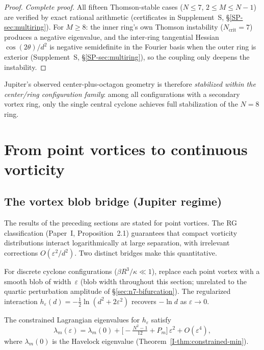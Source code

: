 \begin{proof}
\emph{Complete proof.}
All fifteen Thomson-stable cases ($N \le 7$, $2 \le M \le N{-}1$)
are verified by exact rational arithmetic (certificates in
Supplement~S, \S\ref*{SP-sec:multiring}).
For $M \ge 8$: the inner ring's own Thomson instability
($N_{\mathrm{crit}} = 7$) produces a negative eigenvalue,
and the inter-ring tangential Hessian $\cos(2\theta)/d^2$
is negative semidefinite in the Fourier basis when the
outer ring is exterior (Supplement~S,
\S\ref*{SP-sec:multiring}), so the coupling only
deepens the instability.
\end{proof}

\noindent
Jupiter's observed center-plus-octagon geometry is therefore
\emph{stabilized within the center/ring configuration family}:
among all configurations with a secondary vortex ring,
only the single central cyclone achieves full stabilization
of the $N = 8$ ring.




\section{From point vortices to continuous vorticity}

\subsection{The vortex blob bridge (Jupiter regime)}
\label{sec:blob}

The results of the preceding sections are
stated for point vortices.  The RG classification
(Paper~I, Proposition~2.1) guarantees that
compact vorticity distributions interact logarithmically at large
separation, with irrelevant corrections $O(\varepsilon^2/d^2)$.
Two distinct bridges make this quantitative.

For discrete cyclone configurations ($\beta R^3/\kappa \ll 1$),
replace each point vortex with a smooth blob of width~$\varepsilon$
(blob width throughout this section; unrelated to the quartic
perturbation amplitude of \S\ref{sec:n7-bifurcation}).
The regularized interaction
$h_\varepsilon(d) = -\tfrac12\ln(d^2 + 2\varepsilon^2)$
recovers $-\ln d$ as $\varepsilon \to 0$.

\begin{proposition}
\label{prop:blob}
The constrained Lagrangian eigenvalues for $h_\varepsilon$ satisfy
\begin{equation}\label{eq:blob-correction}
  \lambda_m(\varepsilon) = \lambda_m(0)
  + \bigl[-\tfrac{N^2-1}{12} + P_m\bigr]\,\varepsilon^2
  + O(\varepsilon^4),
\end{equation}
where $\lambda_m(0)$ is the Havelock eigenvalue
(Theorem~\ref*{I-thm:constrained-min}).
\end{proposition}

